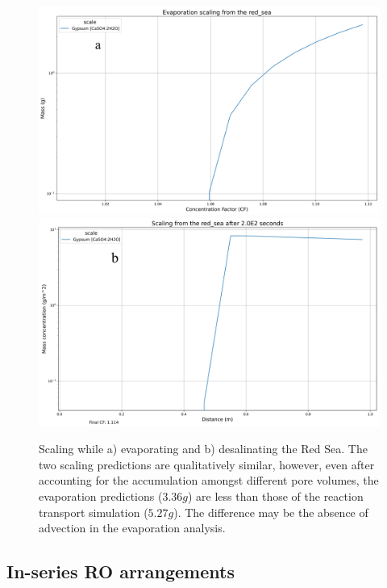 \begin{supplementary}
\begin{figure}
    \centering
    \includegraphics[width=\linewidth]{images/ROSSpy/sensitivity_analyses/evaporation/evaporation.png} \\ \midrule
    \includegraphics[width=\linewidth]{images/ROSSpy/sensitivity_analyses/evaporation/desalination.png}
    \caption{
        Scaling while a) evaporating and b) desalinating the Red Sea. The two scaling predictions are qualitatively similar, however, even after accounting for the accumulation amongst different pore volumes, the evaporation predictions ($3.36g$) are less than those of the reaction transport simulation ($5.27g$). The difference may be the absence of advection in the evaporation analysis.
    }
    \label{evaporation}
\end{figure}


\subsection{In-series RO arrangements}


\end{supplementary}
